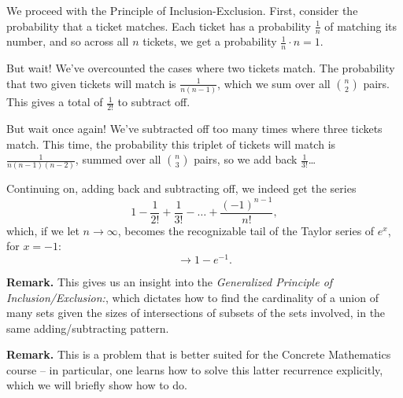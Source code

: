 \documentclass[../main.tex]{subfiles}
\begin{document}
\begin{solution}
We proceed with the Principle of Inclusion-Exclusion. 
First, consider the probability that a ticket matches. Each ticket has a probability $\frac{1}{n}$ of matching its number, and so across all $n$ tickets, we get a probability $\frac{1}{n} \cdot n = 1$. 

But wait! We've overcounted the cases where two tickets match. The probability that two given tickets will match is $\frac{1}{n(n-1)}$, which we sum over all $\binom{n}{2}$ pairs. This gives a total of $\frac{1}{2!}$ to subtract off. 

But wait once again! We've subtracted off too many times where three tickets match. This time, the probability this triplet of tickets will match is $\frac{1}{n(n-1)(n-2)}$, summed over all $\binom{n}{3}$ pairs, so we add back $\frac{1}{3!}$\ldots

Continuing on, adding back and subtracting off, we indeed get the series
\[
1 - \frac{1}{2!} + \frac{1}{3!} - \ldots + \frac{(-1)^{n-1}}{n!},
\]
which, if we let $n \to \infty$, becomes the recognizable tail of the Taylor series of $e^x$, for $x=-1$: 
\[
	\rightarrow 1 - e^{-1}.
\]

\textbf{Remark.} This gives us an insight into the \textit{Generalized Principle of Inclusion/Exclusion:}, which dictates how to find the cardinality of a union of many sets given the sizes of intersections of subsets of the sets involved, in the same adding/subtracting pattern. 

\end{solution}

\begin{solution}[Solution to 1.3.6, Ex. 10]

\end{solution}

\textbf{Remark.} This is a problem that is better suited for the Concrete Mathematics course -- in particular, one learns how to solve this latter recurrence explicitly, which we will briefly show how to do. 
\end{document}
